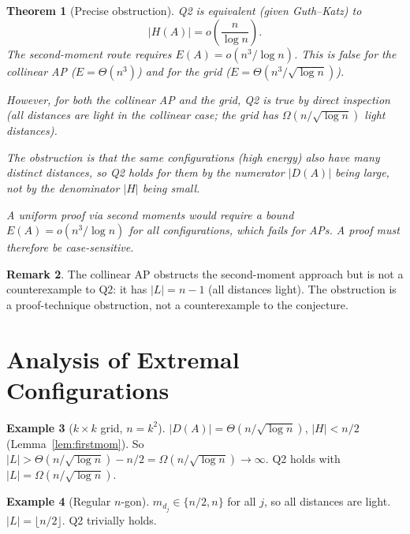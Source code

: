 \documentclass[12pt,a4paper]{amsart}
\def\cL{\textit{L}}\def\cH{\textit{H}}%
\theoremstyle{plain}
\newtheorem{theorem}{Theorem}[section]
\theoremstyle{definition}
\newtheorem{example}[theorem]{Example}
\newtheorem{remark}[theorem]{Remark}
\newcommand{\cL}{\mathcal{L}}
\newcommand{\cH}{\mathcal{H}}
\begin{document}
\begin{mdframed}[style=open]
\begin{theorem}[Precise obstruction]
\label{thm:obstruction}
Q2 is equivalent (given Guth--Katz) to
\[
  |\cH(A)| = o\!\left(\frac{n}{\log n}\right).
\]
The second-moment route requires $E(A) = o(n^3/\log n)$.
This is false for the collinear AP ($E=\Theta(n^3)$) and for the
grid ($E=\Theta(n^3/\sqrt{\log n})$).

However, for both the collinear AP and the grid, Q2 is true by
direct inspection (all distances are light in the collinear case;
the grid has $\Omega(n/\sqrt{\log n})$ light distances).

The obstruction is that the \emph{same configurations} (high energy)
also have many distinct distances, so Q2 holds for them by the
numerator $|D(A)|$ being large, not by the denominator $|\cH|$ being small.

A \emph{uniform} proof via second moments would require a bound
$E(A)=o(n^3/\log n)$ for all configurations, which fails for APs.
A proof must therefore be \emph{case-sensitive}.
\end{theorem}
\end{mdframed}

\begin{remark}
The collinear AP obstructs the second-moment approach but is not a
counterexample to Q2: it has $|\cL|=n-1$ (all distances light).
The obstruction is a proof-technique obstruction, not a
counterexample to the conjecture.
\end{remark}

\section{Analysis of Extremal Configurations}
\label{sec:configs}

\begin{example}[$k\times k$ grid, $n=k^2$]
$|D(A)|=\Theta(n/\sqrt{\log n})$, $|\cH|<n/2$ (Lemma~\ref{lem:firstmom}).
So $|\cL|>\Theta(n/\sqrt{\log n})-n/2=\Omega(n/\sqrt{\log n})\to\infty$.
Q2 holds with $|\cL|=\Omega(n/\sqrt{\log n})$.
\end{example}

\begin{example}[Regular $n$-gon]
$m_{d_j}\in\{n/2,n\}$ for all $j$, so all distances are light.
$|\cL|=\lfloor n/2\rfloor$.  Q2 trivially holds.
\end{example}
\end{document}
